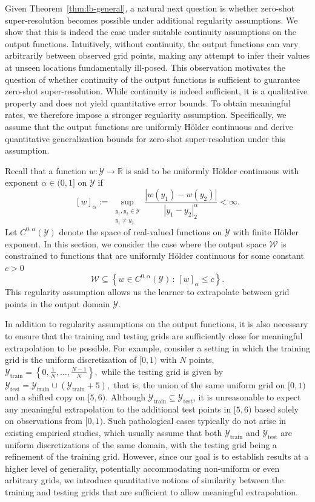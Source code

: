 \documentclass[11pt]{article}
\theoremstyle{plain}
\newcommand{\reals}{\mathbb{R}}
\newcommand{\Ycal}{\mathcal{Y}}
\newcommand{\Wcal}{\mathcal{W}}
\begin{document}
Given Theorem~\ref{thm:lb-general}, a natural next question is whether zero-shot super-resolution becomes possible under additional regularity assumptions. We show that this is indeed the case under suitable continuity assumptions on the output functions.
Intuitively, without continuity, the output functions can vary arbitrarily between observed grid points, making any attempt to infer their values at unseen locations fundamentally ill-posed. This observation motivates the question of whether continuity of the output functions is sufficient to guarantee zero-shot super-resolution. While continuity is indeed sufficient, it is a qualitative property and does not yield quantitative error bounds. To obtain meaningful rates, we therefore impose a stronger regularity assumption. Specifically, we assume that the output functions are uniformly Hölder continuous and derive quantitative generalization bounds for zero-shot super-resolution under this assumption.

Recall that a function $ w: \Ycal \to \reals $ is said to be uniformly Hölder continuous with exponent $ \alpha \in (0,1] $ on $ \Ycal $ if
\[
[w]_{\alpha} := \sup_{\substack{y_1, y_2 \in \Ycal \\ y_1 \neq y_2}} \frac{|w(y_1) - w(y_2)|}{|y_1 - y_2|_2^{\alpha}} < \infty.
\]
Let $ C^{0,\alpha}(\Ycal) $ denote the space of real-valued functions on $ \Ycal $ with finite H{\" o}lder exponent. In this section, we consider the case where the output space $ \Wcal $ is constrained to functions that are uniformly Hölder continuous for some constant $ c > 0 $
\[
\Wcal \subseteq \left\{ w \in C^{0,\alpha}(\Ycal) \,:\, [w]_{\alpha} \leq c \right\}.
\]
 This regularity assumption allows us the learner to extrapolate between grid points in the output domain $\Ycal$.


In addition to regularity assumptions on the output functions, it is also necessary to ensure that the training and testing grids are sufficiently close for meaningful extrapolation to be possible. For example, consider a setting in which the training grid is the uniform discretization of $[0,1)$ with $N$ points, $
\Ycal_{\mathrm{train}} = \left\{ 0, \tfrac{1}{N}, \ldots, \tfrac{N-1}{N} \right\},$
while the testing grid is given by $
\Ycal_{\mathrm{test}} = \Ycal_{\mathrm{train}} \cup (\Ycal_{\mathrm{train}} + 5),$
that is, the union of the same uniform grid on $[0,1)$ and a shifted copy on $[5,6)$. Although $\Ycal_{\mathrm{train}} \subseteq \Ycal_{\mathrm{test}}$, it is unreasonable to expect any meaningful extrapolation to the additional test points in $[5,6)$ based solely on observations from $[0,1)$. Such pathological cases typically do not arise in existing empirical studies, which usually assume that both $\Ycal_{\mathrm{train}}$ and $\Ycal_{\mathrm{test}}$ are uniform discretizations of the same domain, with the testing grid being a refinement of the training grid. However, since our goal is to establish results at a higher level of generality, potentially accommodating non-uniform or even arbitrary grids, we introduce quantitative notions of similarity between the training and testing grids that are sufficient to allow meaningful extrapolation.
\end{document}
